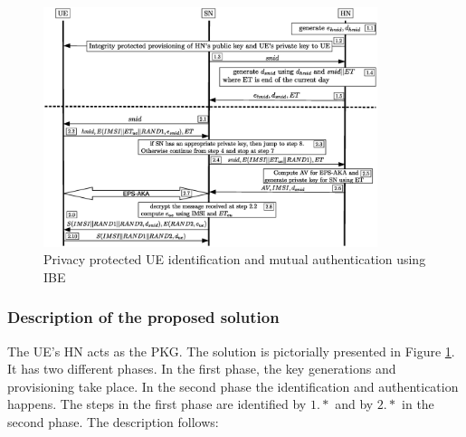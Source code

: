 \documentclass[runningheads,a4paper]{llncs} %
\begin{document}
\begin{figure}
\begin{center}
  \includegraphics[height=7cm]{solution_based_on_ibc.eps}
\caption{Privacy protected UE identification and mutual authentication using IBE}
\label{fig:solution_ibc}       %
\end{center}
\end{figure}

\subsubsection{Description of the proposed solution}
The UE's HN acts as the PKG. The solution is pictorially presented in Figure \ref{fig:solution_ibc}. It has two different phases. In the first phase, the key generations and provisioning take place. In the second phase the identification and authentication happens. The steps in the first phase are identified by $1.*$ and by $2.*$ in the second phase. The description follows:
\end{document}

